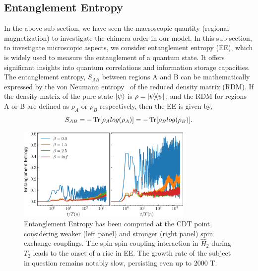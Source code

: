 \documentclass[%
reprint,
superscriptaddress,
amsmath,amssymb,showkeys,
aps,
prb,
]{revtex4-2}
\begin{document}
	\subsection{\label{sec:level41} Entanglement Entropy}
	In the above sub-section, we have seen the macroscopic quantity (regional magnetization) to investigate the chimera order in our model. In this sub-section, to investigate microscopic aspects, we consider entanglement entropy (EE), which is widely used to measure the entanglement of a quantum state. It offers significant insights into quantum correlations and information storage capacities. The entanglement entropy, $S_{AB}$ between regions A and B can be mathematically expressed by the von Neumann entropy~\cite{bayat_entanglement_2022,mendes-santos_measuring_2020} of the reduced density matrix (RDM).   If the density matrix of the pure state $\ket{\psi}$ is $\rho = \ketbra{\psi}$, and the RDM for regions A or B are defined as $\rho_A$ or $\rho_B$ respectively, then the EE is given by,
	\begin{equation} 
		S_{AB} = -\Tr[\rho_A log(\rho_A)] = -\Tr[\rho_B log(\rho_B)].
		\label{eq:vonentrop}
	\end{equation}	
	\begin{figure}
		\begin{center}
			\includegraphics[width=8.5cm]{entangEntrp.pdf}
		\end{center}
		\caption{Entanglement Entropy has been computed at the CDT point, considering weaker (left panel) and stronger (right panel) spin exchange couplings. The spin-spin coupling interaction in $\hat{H}_2$ during $T_2$ leads to the onset of a rise in EE. The growth rate of the subject in question remains notably slow, persisting even up to 2000 T.}
		\label{Fig:entangle}
	\end{figure}
	
\end{document}
